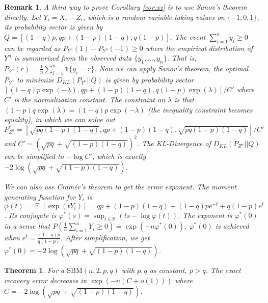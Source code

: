 \documentclass{article}
\newtheorem{theorem}{Theorem}
\newtheorem{remark}{Remark}
\DeclareMathOperator{\E}{\mathbb{E}}
\begin{document}
\begin{remark}
	A third way to prove Corollary \ref{cor:xz} is to use Sanov's theorem directly. Let $Y_i = X_i - Z_i$, which is a random variable
	taking values on $\{-1, 0, 1\}$, its probability vector is given by $Q=[(1-q)p, qp+(1-p)(1-q), q(1-p)]$.
	The event $\sum_{i=1}^n y_i \geq 0 $ can be regarded as $P_{Y^n}(1) - P_{Y^n}(-1) \geq 0$ where the empirical distribution
	of $Y^n$ is summarized from the observed data $\{y_1, \dots, y_n\}$. That is, $P_{Y^n}(r) = \frac{1}{n}\sum_{i=1}^n \bm{1}\{y_i = r\}$.
	Now we can apply Sanov's theorem, the optimal $P_{Y^n}$ to minimize $D_{KL}(P_{Y^n}|| Q)$ is given by
	probability vector $[(1-q)p\exp(-\lambda), qp+(1-p)(1-q), q(1-p)\exp(\lambda)]/C'$ where $C'$ is the normalization constant. The constraint on
	$\lambda$ is that $(1-p)q\exp(\lambda)=(1-q)p\exp(-\lambda)$ (the inequality constraint becomes equality), in which we can solve out
	$P^*_{Z^n} = [\sqrt{pq(1-p)(1-q)}, qp+(1-p)(1-q), \sqrt{pq(1-p)(1-q)}]/C'$ and $C'=(\sqrt{pq}+\sqrt{(1-p)(1-q)})^2$.
	The KL-Divergence of $D_{KL}(P_{Z^n}|| Q)$ can be simplified to $-\log C'$, which is exactly $-2\log (\sqrt{pq}+\sqrt{(1-p)(1-q)})$.
	
	We can also use Cramér's theorem to get the error exponent.
	The moment generating function for $Y_i$ is
	$\varphi(t) = \E[\exp(t Y_i)]
	= qp + (1-p)(1-q) + (1-q)p e^{-t} + q(1-p) e^t$.
	Its conjugate is $\varphi^*(s) = \sup_{t \in \mathbb{R}} (ts - \log \varphi(t))$.
	The exponent is $\varphi^*(0)$ in a sense that $P(\frac{1}{n}\sum_{i=1}^n Y_i\geq 0) \doteq \exp(-n \varphi^*(0))$. $\varphi^*(0)$
	is achieved when $e^t=\frac{(1-q)p}{q(1-p)}$. After simplification,
	we get $\varphi^*(0) = -2\log(\sqrt{pq}+\sqrt{(1-p)(1-q)})$.
\end{remark}
\begin{theorem}\label{thm:2pq}
	For a $\textrm{SBM}(n,2,p, q)$ with $p,q$ as constant, $p > q$. The
	exact recovery error decreases in $\exp(-n (C + o(1)))$
	where $C = -2\log(\sqrt{pq} + \sqrt{(1-p)(1-q)})$.
\end{theorem}
\end{document}
